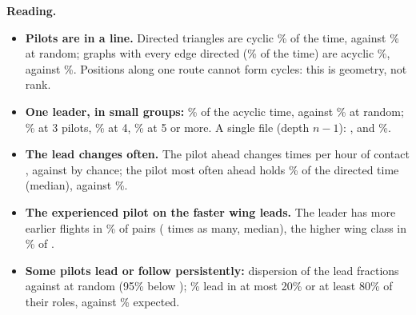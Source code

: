\begin{reading}
\textbf{Reading.}
\begin{itemize}
  \item \textbf{Pilots are in a line.} Directed triangles are cyclic \StCyclic\% \StCyclicBand{} of the time, against
        \StCyclicNull\% at random; graphs with every edge directed (\StFullShare\% of the time) are acyclic \StAcyclic\%,
        against \StAcyclicNull\%. Positions along one route cannot form cycles: this is geometry, not rank.
  \item \textbf{One leader, in small groups:} \StOneLeader\% \StOneLeaderBand{} of the acyclic time, against \StOneLeaderNull\%
        \StOneLeaderNullBand{} at random; \StOneLeaderThree\% at 3 pilots, \StOneLeaderFour\% at 4, \StOneLeaderFive\% at 5 or more.
        A single file (depth $n-1$): \StLineThree, \StLineFour{} and \StLineFive\%.
  \item \textbf{The lead changes often.} The pilot ahead changes \StSwitches{} times per hour of contact \StSwitchesBand{},
        against \StSwitchesChance{} \StSwitchesChanceBand{} by chance; the pilot most often ahead holds \StDominant\% of the
        directed time (median), against \StDominantChance\%.
  \item \textbf{The experienced pilot on the faster wing leads.} The leader has more earlier flights in \StExp\%
        \StExpBand{} of \StExpPairs{} pairs (\StExpRatio{} times as many, median), the higher wing class in \StWing\%
        \StWingBand{} of \StWingPairs.
  \item \textbf{Some pilots lead or follow persistently:} dispersion of the lead fractions \HabitualDispersion{} against
        \HabitualNull{} at random (95\% below \HabitualNullHigh); \HabitualExtreme\% lead in at most 20\% or at least
        80\% of their roles, against \HabitualExtremeNull\% expected.
\end{itemize}
\end{reading}

